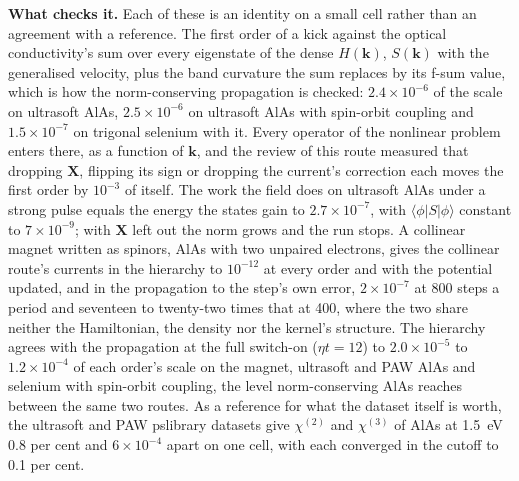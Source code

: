 \documentclass[11pt,a4paper]{article}
\begin{document}
\textbf{What checks it.} Each of these is an identity on a small cell rather than an
agreement with a reference. The first order of a kick against the optical
conductivity's sum over every eigenstate of the dense $H(\mathbf k)$, $S(\mathbf k)$ with
the generalised velocity, plus the band curvature the sum replaces by its f-sum value,
which is how the norm-conserving propagation is checked: $2.4\times10^{-6}$ of the scale
on ultrasoft AlAs, $2.5\times10^{-6}$ on ultrasoft AlAs with spin-orbit coupling and
$1.5\times10^{-7}$ on trigonal selenium with it.
Every operator of the nonlinear problem enters there, as a function of $\mathbf k$, and
the review of this route measured that dropping $\mathbf X$, flipping its sign or
dropping the current's correction each moves the first order by $10^{-3}$ of itself.
The work the field does on ultrasoft AlAs under a strong pulse equals the energy the
states gain to $2.7\times10^{-7}$, with $\langle\phi|S|\phi\rangle$ constant to
$7\times10^{-9}$; with $\mathbf X$ left out the norm grows and the run stops. A
collinear magnet written as spinors, AlAs with two unpaired electrons, gives the
collinear route's currents in the hierarchy to $10^{-12}$ at every order and with the
potential updated, and in the propagation to the step's own error, $2\times10^{-7}$ at 800
steps a period and seventeen to twenty-two times that at 400, where the two share neither
the Hamiltonian, the density nor the kernel's structure. The hierarchy agrees with the
propagation at the full switch-on ($\eta t = 12$) to $2.0\times10^{-5}$ to
$1.2\times10^{-4}$ of each order's scale on the magnet, ultrasoft and PAW AlAs and
selenium with spin-orbit coupling, the level norm-conserving AlAs reaches between the
same two routes. As a reference for what the dataset itself is worth, the ultrasoft and
PAW pslibrary datasets give $\chi^{(2)}$ and $\chi^{(3)}$ of AlAs at 1.5~eV
0.8 per cent and $6\times10^{-4}$ apart on one cell, with each converged in the cutoff to
0.1 per cent.
\end{document}
